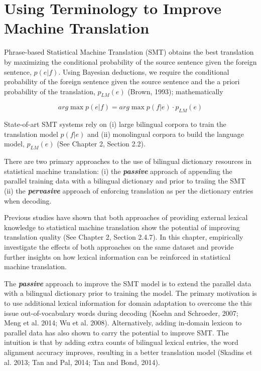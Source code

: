 \newpage
\chapter{Using Terminology to Improve Machine Translation}
\label{chap:terminmt}

Phrase-based Statistical Machine Translation (SMT) obtains the best translation by maximizing the conditional probability of the source sentence given the foreign sentence, $p(e|f)$. Using Bayesian deductions, we require the conditional probability of the foreign sentence given the source sentence and the a priori probability of the translation, $p_{LM}(e)$ (Brown, 1993); mathematically

\begin{equation}
arg\max _{  }{ p(e|f)=arg\max _{  }{ p(f|e)\cdot { p }_{ LM }(e) }  } 
\end{equation}


State-of-art SMT systems rely on (i) large bilingual corpora to train the translation model $p(f|e)$ and (ii) monolingual corpora to build the language model, $p_{LM}(e)$ (See Chapter 2, Section 2.2).

There are two primary approaches to the use of bilingual dictionary resources in statistical machine translation: (i) the \textbf{\textit{passive}} approach of appending the parallel training data with a bilingual dictionary and prior to traiing the SMT (ii) the \textbf{\textit{pervasive}} approach of enforcing translation as per the dictionary entries when decoding. 

Previous studies have shown that both approaches of providing external lexical knowledge to statistical machine translation show the potential of improving translation quality (See Chapter 2, Section 2.4.7). In this chapter, empirically investigate the effects of both approaches on the same dataset and provide further insights on how lexical information can be reinforced in statistical machine translation.

The \textbf{\textit{passive}} approach to improve the SMT model is to extend the parallel data with a bilingual dictionary prior to training the model. The primary motivation is to use additional lexical information for domain adaptation to overcome the this issue out-of-vocabulary words during decoding (Koehn and Schroeder, 2007; Meng et al. 2014; Wu et al. 2008). Alternatively, adding in-domain lexicon to parallel data has also shown to carry the potential to improve SMT. The intuition is that by adding extra counts of bilingual lexical entries, the word alignment accuracy improves, resulting in a better translation model (Skadins et al. 2013; Tan and Pal, 2014; Tan and Bond, 2014).

